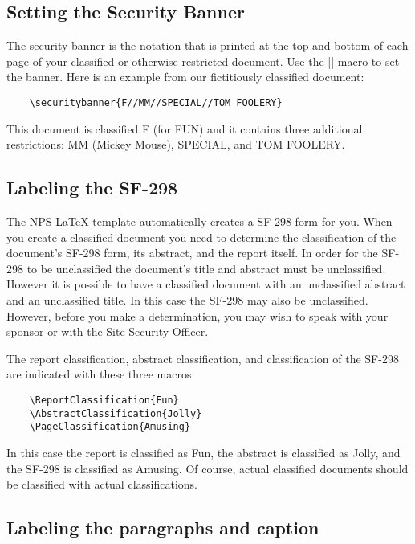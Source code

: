 \subsection{Setting the Security Banner}

The security banner is the notation that is printed at the top and
bottom of each page of your classified or otherwise restricted
document. Use the |\securitybanner{}| macro to set the banner. Here is
an example from our fictitiously classified document:

\begin{Verbatim}
    \securitybanner{F//MM//SPECIAL//TOM FOOLERY}
\end{Verbatim}

This document is classified F (for FUN) and it contains three
additional restrictions: MM (Mickey Mouse), SPECIAL, and TOM FOOLERY.  

\subsection{Labeling the SF-298}

The NPS \LaTeX{} template automatically creates a SF-298 form for
you. When you create a classified document you need to determine the
classification of the document's SF-298 form, its abstract, and the
report itself. In order for the SF-298 to be unclassified the
document's title and abstract must be unclassified. However it is
possible to have a classified document with an unclassified abstract
and an unclassified title. In this case the SF-298 may also be
unclassified. However, before you make a determination, you may wish
to speak with your sponsor or with the Site Security Officer. 

The report classification, abstract classification, and classification
of the SF-298 are indicated with these three macros:

\begin{Verbatim}
    \ReportClassification{Fun}
    \AbstractClassification{Jolly}
    \PageClassification{Amusing}
\end{Verbatim}

In this case the report is classified as Fun, the abstract is classified
as Jolly, and the SF-298 is classified as Amusing. Of course, actual 
classified documents should be classified with actual classifications.

\subsection{Labeling the paragraphs and caption}

